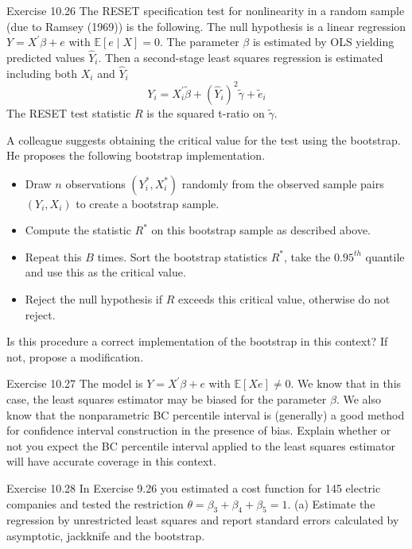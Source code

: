 \documentclass[10pt]{article}
\begin{document}
Exercise 10.26 The RESET specification test for nonlinearity in a random sample (due to Ramsey (1969)) is the following. The null hypothesis is a linear regression $Y=X^{\prime} \beta+e$ with $\mathbb{E}[e \mid X]=0$. The parameter $\beta$ is estimated by OLS yielding predicted values $\widehat{Y}_{i}$. Then a second-stage least squares regression is estimated including both $X_{i}$ and $\widehat{Y}_{i}$
$$
Y_{i}=X_{i}^{\prime} \widetilde{\beta}+\left(\widehat{Y}_{i}\right)^{2} \widetilde{\gamma}+\widetilde{e}_{i}
$$
The RESET test statistic $R$ is the squared t-ratio on $\widetilde{\gamma}$.

A colleague suggests obtaining the critical value for the test using the bootstrap. He proposes the following bootstrap implementation.

\begin{itemize}
  \item Draw $n$ observations $\left(Y_{i}^{*}, X_{i}^{*}\right)$ randomly from the observed sample pairs $\left(Y_{i}, X_{i}\right)$ to create a bootstrap sample.

  \item Compute the statistic $R^{*}$ on this bootstrap sample as described above.

  \item Repeat this $B$ times. Sort the bootstrap statistics $R^{*}$, take the $0.95^{t h}$ quantile and use this as the critical value.

  \item Reject the null hypothesis if $R$ exceeds this critical value, otherwise do not reject.

\end{itemize}
Is this procedure a correct implementation of the bootstrap in this context? If not, propose a modification.

Exercise 10.27 The model is $Y=X^{\prime} \beta+e$ with $\mathbb{E}[X e] \neq 0$. We know that in this case, the least squares estimator may be biased for the parameter $\beta$. We also know that the nonparametric BC percentile interval is (generally) a good method for confidence interval construction in the presence of bias. Explain whether or not you expect the BC percentile interval applied to the least squares estimator will have accurate coverage in this context.

Exercise 10.28 In Exercise 9.26 you estimated a cost function for 145 electric companies and tested the restriction $\theta=\beta_{3}+\beta_{4}+\beta_{5}=1$. (a) Estimate the regression by unrestricted least squares and report standard errors calculated by asymptotic, jackknife and the bootstrap.
\end{document}
